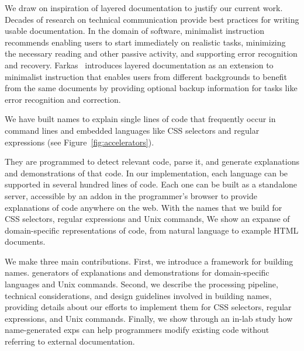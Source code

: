 We draw on inspiration of layered documentation to justify our current work. 
Decades of research on technical communication provide best practices for writing usable documentation.
In the domain of software, minimalist instruction~\cite{carroll_nurnberg_1990} recommends enabling users to start immediately on realistic tasks, minimizing the necessary  reading and other passive activity, and supporting error recognition and recovery.
Farkas~\cite{farkas_layering_1998} introduces layered documentation as an extension to minimalist instruction that enables users from different backgrounds to benefit from the same documents by providing optional backup information for tasks like error recognition and correction.
\fi 
%
\begin{changes}
We have built \Glspl{name} to explain single lines of code that frequently occur in command lines and embedded languages like CSS selectors and regular expressions (see Figure~\ref{fig:accelerators}).
\end{changes}
 They are programmed to detect relevant code, parse it, and generate explanations and demonstrations of that code. 
 \fi
In our implementation, each language can be supported in several hundred lines of code.
Each one can be built as a standalone server, accessible by an addon in the programmer's browser to provide explanations of code anywhere on the web.
 With the \Glspl{name} that we build for CSS selectors, regular expressions and Unix commands, \fi {} We show an expanse of domain-specific representations of code, from natural language to example HTML documents.\fi 

We make three main contributions.
First, we introduce a framework for building \Glspl{name}.  generators of explanations and demonstrations for domain-specific languages and Unix commands. \fi
Second, we describe the processing pipeline, technical considerations, and design guidelines involved in building \Glspl{name}, providing details about our efforts to implement them for CSS selectors, regular expressions, and Unix commands.
Finally, we show through an in-lab study how \Gls{name}-generated \glspl{exp} can help programmers modify existing code without referring to external documentation.
